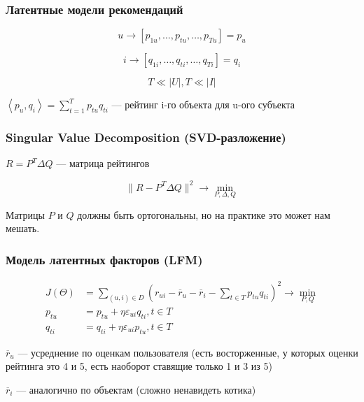 \documentclass[fullscreen=true, bookmarks=true, hyperref={pdfencoding=unicode}]{beamer}
\begin{document}
\begin{frame}
  \frametitle{Латентные модели рекомендаций}

  $$ u \to [p_{1u},\dots, p_{tu}, \dots, p_{Tu}] = p_u$$

  $$ i \to [q_{1i},\dots, q_{ti}, \dots, q_{Ti}] = q_i$$

  $$T \ll |U|, T \ll |I|$$

  $ \left<p_u, q_i\right> = \sum\limits_{t=1}^T p_{tu} q_{ti} $ — рейтинг i-го объекта для u-ого субъекта
\end{frame}


\begin{frame}
  \frametitle{Singular Value Decomposition (SVD-разложение)}

  $ R = P^T \Delta Q$ — матрица рейтингов

  $$ \|R -  P^T \Delta Q\|^2 \to \min\limits_{P, \Delta, Q} $$

  Матрицы $P$ и $Q$ должны быть ортогональны, но на практике это может нам мешать.
\end{frame}


\begin{frame}
  \frametitle{Модель латентных факторов (LFM)}

  \begin{align*}
   J(\Theta) &= \sum\limits_{(u,i) \in D} \left( r_{ui} - \overline r_{u} - \overline r_{i} - \sum\limits_{t \in T} p_{tu}q_{ti}\right)^2 \to \min\limits_{P, Q} \\
  p_{tu} &= p_{tu} + \eta \varepsilon_{ui}q_{ti}, t \in T \\
  q_{ti} &= q_{ti} + \eta \varepsilon_{ui}p_{tu}, t \in T
  \end{align*}

  $\overline r_{u}$ — усреднение по оценкам пользователя (есть восторженные, у которых оценки рейтинга это 4 и 5, есть наоборот ставящие только 1 и 3 из 5)

  $\overline r_{i}$ — аналогично по объектам (сложно ненавидеть котика)
\end{frame}
\end{document}

